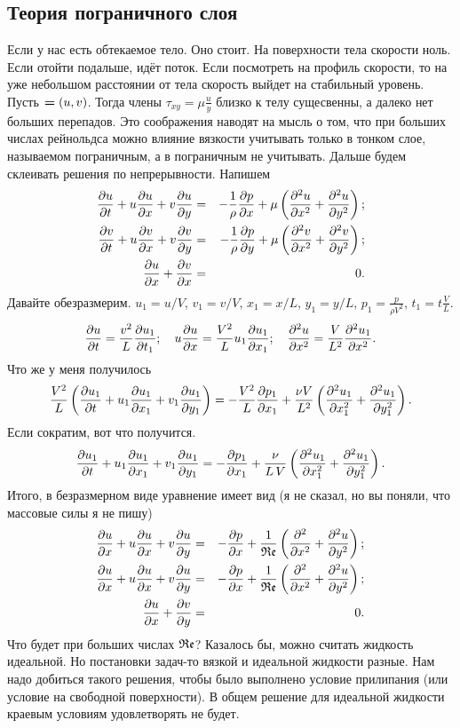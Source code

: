 \subsection{Теория пограничного слоя}
Если у нас есть обтекаемое тело. Оно стоит. На поверхности тела скорости ноль. Если отойти подальше, идёт поток. Если посмотреть на профиль скорости, то на уже небольшом расстоянии от тела скорость выйдет на стабильный уровень. Пусть $\boldsymbol{=} (u,v)$. Тогда члены $\tau_{xy} = \mu\frac uy$ близко к телу сущесвенны, а далеко нет больших перепадов. Это соображения наводят на мысль о том, что при больших числах рейнольдса можно влияние вязкости учитывать только в тонком слое, называемом пограничным, а в пограничным не учитывать. Дальше будем склеивать решения по непрерывности.
%
Напишем 
\begin{eqnarray*}
  \frac{\partial u}{\partial t} + u\frac{\partial u}{\partial x} + v\frac{\partial u}{\partial y} &=&-\frac1\rho\frac{\partial p}{\partial x} + \mu\left(\frac{\partial ^2u}{\partial x^2} + \frac{\partial ^2u}{\partial y^2}\right);\\
  \frac{\partial v}{\partial t} + u\frac{\partial v}{\partial x} + v\frac{\partial v}{\partial y} &=&-\frac1\rho\frac{\partial p}{\partial y} + \mu\left(\frac{\partial ^2v}{\partial x^2} + \frac{\partial ^2v}{\partial y^2}\right);\\
  \frac{\partial u}{\partial x} + \frac{\partial v}{\partial x} &=& 0.
\end{eqnarray*}
Давайте обезразмерим.  $u_1 = u/V$, $v_1 = v/V$, $x_1 = x/L$, $y_1 = y/L$, $p_1 = \frac p{\rho V^2}$, $t_1=t\frac VL$.
\[
  \frac{\partial u}{\partial t} = \frac{v^2}L\frac{\partial u_1}{\partial t_1};\quad
  u\frac{\partial u}{\partial x} = \frac{V^2}L u_1\frac{\partial u_1}{\partial x_1};\quad
  \frac{\partial ^2u}{\partial x^2} = \frac V{L^2}\frac{\partial ^2u_1}{\partial x^2}.
\]
Что же у меня получилось
\[
  \frac{V^2}L\left(\frac{\partial u_1}{\partial t} + u_1\frac{\partial u_1}{\partial x_1}+v_1\frac{\partial u_1}{\partial y_1}\right) = 
  - \frac{V^2}L\frac{\partial p_1}{\partial x_1} + \frac{\nu V}{L^2}\left(\frac{\partial ^2u_1}{\partial x_1^2} + \frac{\partial ^2u_1}{\partial y_1^2}\right).
\]
Если сократим, вот что получится.
\[
  \frac{\partial u_1}{\partial t} + u_1\frac{\partial u_1}{\partial x_1}+v_1\frac{\partial u_1}{\partial y_1} = 
  - \frac{\partial p_1}{\partial x_1} + \frac{\nu}{L\, V}\left(\frac{\partial ^2u_1}{\partial x_1^2} + \frac{\partial ^2u_1}{\partial y_1^2}\right).
\]
Итого, в безразмерном виде уравнение имеет вид (я не сказал, но вы поняли, что массовые силы я не пишу)
\begin{eqnarray*}
  \frac{\partial u}{\partial x} + u\frac{\partial u}{\partial x} + v\frac{\partial u}{\partial y} &=& -\frac{\partial p}{\partial x} + \frac1{\mathfrak{Re}}\left(\frac{\partial ^2}{\partial x^2} + \frac{\partial ^2u}{\partial y^2}\right);\\
  \frac{\partial u}{\partial x} + u\frac{\partial u}{\partial x} + v\frac{\partial u}{\partial y} &=& -\frac{\partial p}{\partial x} + \frac1{\mathfrak{Re}}\left(\frac{\partial ^2}{\partial x^2} + \frac{\partial ^2u}{\partial y^2}\right);\\
  \frac{\partial u}{\partial x} + \frac{\partial v}{\partial y} &=& 0.
\end{eqnarray*}
Что будет при больших числах $\mathfrak{Re}$? Казалось бы, можно считать жидкость идеальной. Но постановки задач-то вязкой и идеальной жидкости разные. Нам надо добиться такого решения, чтобы было выполнено условие прилипания (или условие на свободной поверхности). В общем решение для идеальной жидкости краевым условиям удовлетворять не будет.

